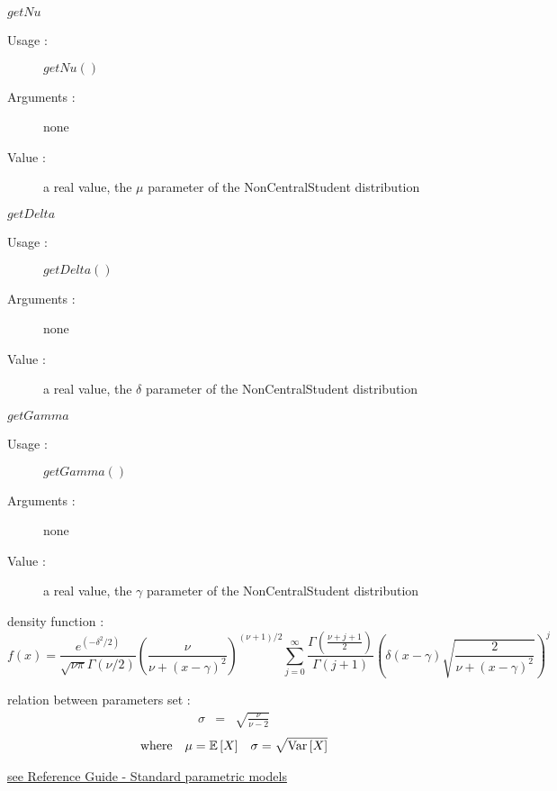 \begin{description}
\begin{description}
  \item $getNu$
    \begin{description}
    \item[Usage :] $getNu()$
    \item[Arguments :] none
    \item[Value :]  a real value,  the $\mu$ parameter of the NonCentralStudent distribution
    \end{description}
    \bigskip
  \item $getDelta$
    \begin{description}
    \item[Usage :] $getDelta()$
    \item[Arguments :] none
    \item[Value :]  a real value,  the $\delta$ parameter of the NonCentralStudent distribution
    \end{description}
    \bigskip
  \item $getGamma$
    \begin{description}
    \item[Usage :] $getGamma()$
    \item[Arguments :] none
    \item[Value :]  a real value,  the $\gamma$ parameter of the NonCentralStudent distribution
    \end{description}
    \bigskip
  \end{description}

\item[Details :]  \rule{0pt}{1em}
  \begin{description}
  \item density function :
    $$
    f(x) =\frac{e^{(-\delta^2 / 2)}}{\sqrt{\nu\pi} \Gamma(\nu / 2)}\left(\frac{\nu}{\nu + (x-\gamma)^2}\right) ^ {(\nu + 1) / 2} \sum_{j=0}^{\infty} \frac{\Gamma\left(\frac{\nu + j + 1}{2}\right)}{\Gamma(j + 1)}\left(\delta(x-\gamma)\sqrt{\frac{2}{\nu + (x-\gamma)^2}}\right) ^ j
    $$
  \item relation between parameters set :
    \begin{eqnarray*}
      \sigma            &  =    &       \sqrt{\frac{\nu}{\nu-2} }
    \end{eqnarray*}
    \begin{align*}
      \mbox{where}
      &&
      \mu = {\mathbb E}\left[ X \right]
      &&
      \sigma = \sqrt{{\rm Var}\left[ X \right] }
    \end{align*}
  \end{description}

\item[Links :]  \rule{0pt}{1em}
  \href{OpenTURNS_ReferenceGuide.pdf}{see Reference Guide - Standard parametric models}
\end{description}


